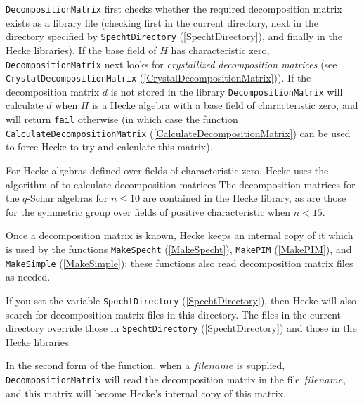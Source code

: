 \documentclass[a4paper,11pt]{report}
\begin{document}
{{{ \texttt{DecompositionMatrix} first checks whether the required decomposition matrix exists as a library
file (checking first in the current directory, next in the directory specified
by \texttt{SpechtDirectory} (\ref{SpechtDirectory}), and finally in the \textsf{Hecke} libraries). If the base field of $H$ has characteristic zero, \texttt{DecompositionMatrix} next looks for \emph{crystallized decomposition matrices} (see \texttt{CrystalDecompositionMatrix} (\ref{CrystalDecompositionMatrix})). If the decomposition matrix $d$ is not stored in the library \texttt{DecompositionMatrix} will calculate $d$ when $H$ is a Hecke algebra with a base field of characteristic zero, and will return \texttt{fail} otherwise (in which case the function \texttt{CalculateDecompositionMatrix} (\ref{CalculateDecompositionMatrix}) can be used to force \textsf{Hecke} to try and calculate this matrix).

 For Hecke algebras defined over fields of characteristic zero, \textsf{Hecke} uses the algorithm of \cite{LLT} to calculate decomposition matrices The decomposition matrices for the $q$-Schur algebras for $n\leq10$ are contained in the \textsf{Hecke} library, as are those for the symmetric group over fields of positive
characteristic when $n<15$.

 Once a decomposition matrix is known, \textsf{Hecke} keeps an internal copy of it which is used by the functions \texttt{MakeSpecht} (\ref{MakeSpecht}), \texttt{MakePIM} (\ref{MakePIM}), and \texttt{MakeSimple} (\ref{MakeSimple}); these functions also read decomposition matrix files as needed.

 If you set the variable \texttt{SpechtDirectory} (\ref{SpechtDirectory}), then \textsf{Hecke} will also search for decomposition matrix files in this directory. The files
in the current directory override those in \texttt{SpechtDirectory} (\ref{SpechtDirectory}) and those in the \textsf{Hecke} libraries.

 In the second form of the function, when a $filename$ is supplied, \texttt{DecompositionMatrix} will read the decomposition matrix in the file $filename$, and this matrix will become \textsf{Hecke}'s internal copy of this matrix.

}}}
\end{document}
